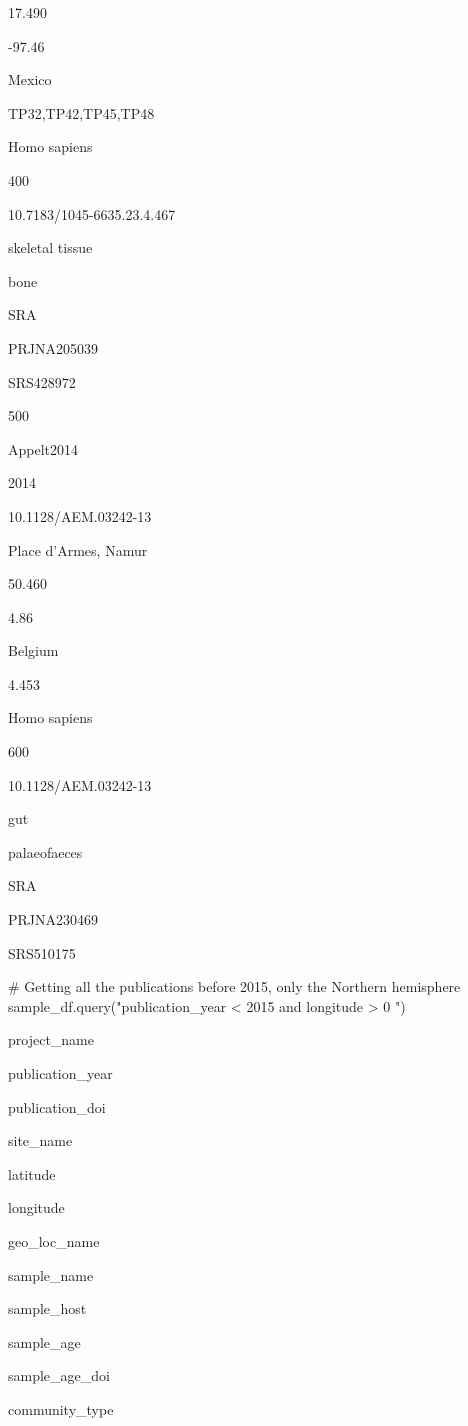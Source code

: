 \documentclass[
  letterpaper,
]{book}
\newenvironment{Shaded}{}{}
\newcommand{\CommentTok}[1]{\textcolor[rgb]{0.42,0.45,0.49}{#1}}
\newcommand{\NormalTok}[1]{\textcolor[rgb]{0.14,0.16,0.18}{#1}}
\newcommand{\StringTok}[1]{\textcolor[rgb]{0.01,0.18,0.38}{#1}}
\begin{document}
17.490

-97.46

Mexico

TP32,TP42,TP45,TP48

Homo sapiens

400

10.7183/1045-6635.23.4.467

skeletal tissue

bone

SRA

PRJNA205039

SRS428972

500

Appelt2014

2014

10.1128/AEM.03242-13

Place d'Armes, Namur

50.460

4.86

Belgium

4.453

Homo sapiens

600

10.1128/AEM.03242-13

gut

palaeofaeces

SRA

PRJNA230469

SRS510175

\begin{Shaded}
\begin{Highlighting}[]
\CommentTok{\# Getting all the publications before 2015, only the Northern hemisphere}
\NormalTok{sample\_df.query(}\StringTok{"publication\_year \textless{} 2015 and longitude \textgreater{} 0 "}\NormalTok{)}
\end{Highlighting}
\end{Shaded}

project\_name

publication\_year

publication\_doi

site\_name

latitude

longitude

geo\_loc\_name

sample\_name

sample\_host

sample\_age

sample\_age\_doi

community\_type
\end{document}
